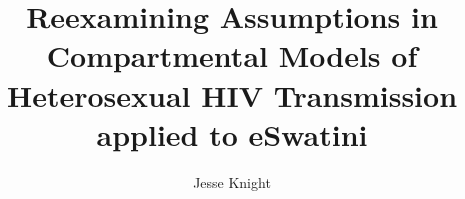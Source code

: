 \author{Jesse Knight}
\title{{Reexamining Assumptions in\linebreak
  Compartmental Models of Heterosexual HIV Transmission\linebreak
  applied to eSwatini}}
